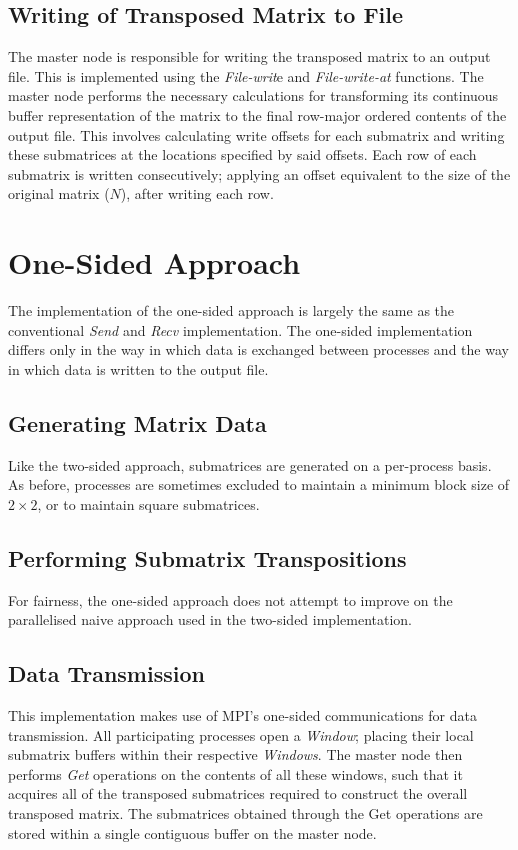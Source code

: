 \documentclass[journal,10pt,a4paper]{IEEEtran}
\begin{document}
\subsection{Writing of Transposed Matrix to File}

The master node is responsible for writing the transposed matrix to an output file. This is implemented using the \textit{File-writ}e and \textit{File-write-at} functions. The master node performs the necessary calculations for transforming its continuous buffer representation of the matrix to the final row-major ordered contents of the output file. This involves calculating write offsets for each submatrix and writing these submatrices at the locations specified by said offsets. Each row of each submatrix is written consecutively; applying an offset equivalent to the size of the original matrix ($N$), after writing each row.



\section{One-Sided Approach}

The implementation of the one-sided approach is largely the same as the conventional \textit{Send} and \textit{Recv} implementation. The one-sided implementation differs only in the way in which data is exchanged between processes and the way in which data is written to the output file.

\subsection{Generating Matrix Data}
Like the two-sided approach, submatrices are generated on a per-process basis. As before, processes are sometimes excluded to maintain a minimum block size of $2 \times 2$, or to maintain square submatrices.


\subsection{Performing Submatrix Transpositions}
For fairness, the one-sided approach does not attempt to improve on the parallelised naive approach used in the two-sided implementation.

\subsection{Data Transmission}
This implementation makes use of MPI's one-sided communications for data transmission. All participating processes open a \textit{Window}; placing their local submatrix buffers within their respective \textit{Windows}. The master node then performs \textit{Get} operations on the contents of all these windows, such that it acquires all of the transposed submatrices required to construct the overall transposed matrix. The submatrices obtained through the Get operations are stored within a single contiguous buffer on the master node.
\end{document}
